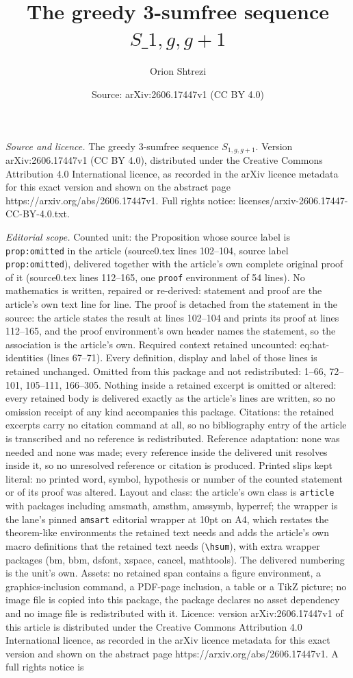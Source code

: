 \documentclass[10pt,a4paper]{amsart}
\title[The greedy 3-sumfree sequence $S\_{1,g,g+1}$]{The greedy 3-sumfree sequence $S\_{1,g,g+1}$}
\author{Orion Shtrezi}
\date{Source: arXiv:2606.17447v1 (CC BY 4.0)}
\begin{document}
\maketitle

\noindent\emph{Source and licence.} The greedy 3-sumfree sequence $S_{1,g,g+1}$. Version arXiv:2606.17447v1 (CC BY 4.0), distributed under the Creative Commons Attribution 4.0 International licence, as recorded in the arXiv licence metadata for this exact version and shown on the abstract page https://arxiv.org/abs/2606.17447v1. Full rights notice: licenses/arxiv-2606.17447-CC-BY-4.0.txt.\par\smallskip

\noindent\textit{Editorial scope.} Counted unit: the Proposition whose source label is \texttt{prop:omitted} in the article (source0.tex lines 102--104, source label \texttt{prop:omitted}), delivered together with the article's own complete original proof of it (source0.tex lines 112--165, one \texttt{proof} environment of 54 lines). No mathematics is written, repaired or re-derived: statement and proof are the article's own text line for line. The proof is detached from the statement in the source: the article states the result at lines 102--104 and prints its proof at lines 112--165, and the proof environment's own header names the statement, so the association is the article's own. Required context retained uncounted: eq:hat-identities (lines 67--71). Every definition, display and label of those lines is retained unchanged. Omitted from this package and not redistributed: 1--66, 72--101, 105--111, 166--305. Nothing inside a retained excerpt is omitted or altered: every retained body is delivered exactly as the article's lines are written, so no omission receipt of any kind accompanies this package. Citations: the retained excerpts carry no citation command at all, so no bibliography entry of the article is transcribed and no reference is redistributed. Reference adaptation: none was needed and none was made; every reference inside the delivered unit resolves inside it, so no unresolved reference or citation is produced. Printed slips kept literal: no printed word, symbol, hypothesis or number of the counted statement or of its proof was altered. Layout and class: the article's own class is \texttt{article} with packages including amsmath, amsthm, amssymb, hyperref; the wrapper is the lane's pinned \texttt{amsart} editorial wrapper at 10pt on A4, which restates the theorem-like environments the retained text needs and adds the article's own macro definitions that the retained text needs (\texttt{\textbackslash hsum}), with extra wrapper packages (bm, bbm, dsfont, xspace, cancel, mathtools). The delivered numbering is the unit's own. Assets: no retained span contains a figure environment, a graphics-inclusion command, a PDF-page inclusion, a table or a TikZ picture; no image file is copied into this package, the package declares no asset dependency and no image file is redistributed with it. Licence: version arXiv:2606.17447v1 of this article is distributed under the Creative Commons Attribution 4.0 International licence, as recorded in the arXiv licence metadata for this exact version and shown on the abstract page https://arxiv.org/abs/2606.17447v1. A full rights notice is 
\end{document}
